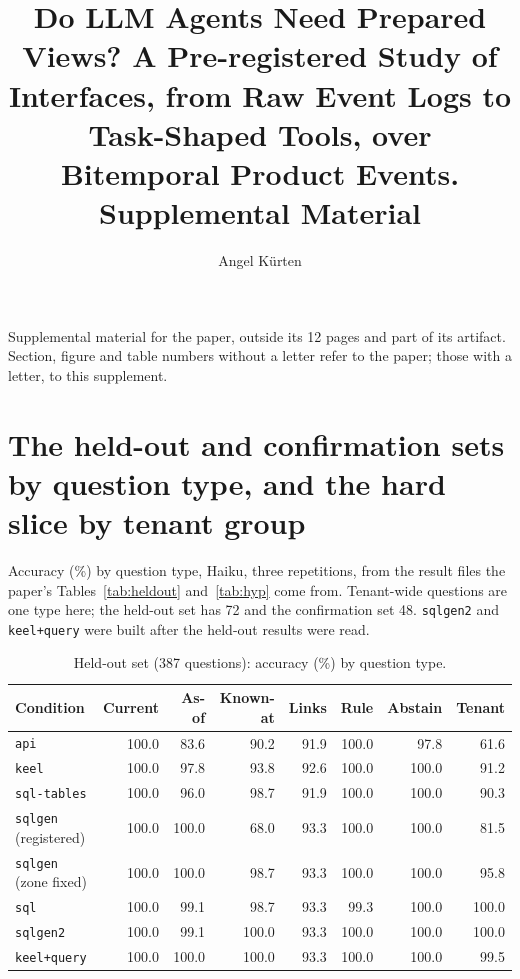 \documentclass[sigconf, nonacm]{acmart}
\newcommand{\code}[1]{\texttt{#1}}
\begin{document}
\title{Do LLM Agents Need Prepared Views? A Pre-registered Study of Interfaces, from Raw Event Logs to Task-Shaped Tools, over Bitemporal Product Events. Supplemental Material}
\author{Angel K\"urten}
\maketitle
\noindent Supplemental material for the paper, outside its 12 pages and part of its artifact. Section, figure and table numbers without a letter refer to the paper; those with a letter, to this supplement.

\appendix
\renewcommand{\thetable}{\thesection.\arabic{table}}

\section{The held-out and confirmation sets by question type, and the hard slice by tenant group}
\label{app:sets}
\setcounter{table}{0}

Accuracy (\%) by question type, Haiku, three repetitions, from the result files the paper's Tables~\ref{tab:heldout} and~\ref{tab:hyp} come from. Tenant-wide questions are one type here; the held-out set has 72 and the confirmation set 48. \code{sqlgen2} and \code{keel+query} were built after the held-out results were read.

\begin{table}[t]
\caption{Held-out set (387 questions): accuracy (\%) by question type.}
\label{tab:heldout-types}
\centering
\footnotesize
\begin{tabular}{l r r r r r r r }
\toprule
Condition & Current & As-of & Known-at & Links & Rule & Abstain & Tenant \\
\midrule
\code{api} & 100.0 & 83.6 & 90.2 & 91.9 & 100.0 & 97.8 & 61.6 \\
\code{keel} & 100.0 & 97.8 & 93.8 & 92.6 & 100.0 & 100.0 & 91.2 \\
\code{sql-tables} & 100.0 & 96.0 & 98.7 & 91.9 & 100.0 & 100.0 & 90.3 \\
\code{sqlgen} (registered) & 100.0 & 100.0 & 68.0 & 93.3 & 100.0 & 100.0 & 81.5 \\
\code{sqlgen} (zone fixed) & 100.0 & 100.0 & 98.7 & 93.3 & 100.0 & 100.0 & 95.8 \\
\code{sql} & 100.0 & 99.1 & 98.7 & 93.3 & 99.3 & 100.0 & 100.0 \\
\code{sqlgen2} & 100.0 & 99.1 & 100.0 & 93.3 & 100.0 & 100.0 & 100.0 \\
\code{keel+query} & 100.0 & 100.0 & 100.0 & 93.3 & 100.0 & 100.0 & 99.5 \\
\bottomrule
\end{tabular}
\end{table}
\end{document}
